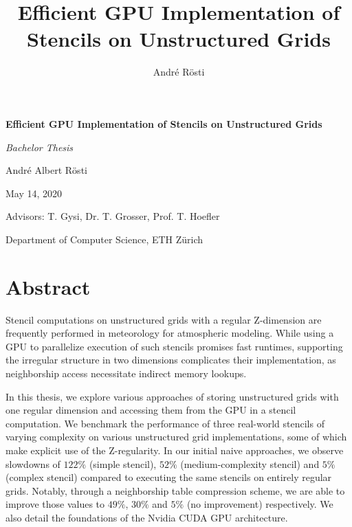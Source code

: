 \documentclass[a4paper, 11pt]{book}
\title{Efficient GPU Implementation of Stencils on Unstructured Grids}
\author{André Rösti}
\begin{document}
\begin{titlepage}
		
	\begin{center}
		
		{\Huge \textbf{Efficient GPU Implementation of Stencils on Unstructured Grids}}
		
		\vspace{2cm}
		
		{\Large \textit{Bachelor Thesis}}
		
		\vspace{2cm}
		
		André Albert Rösti
		
		May 14, 2020
		
	\end{center}
		
	\vfill
		
	\raggedleft Advisors: T. Gysi, Dr. T. Grosser, Prof. T. Hoefler
		
	\raggedleft Department of Computer Science, ETH Zürich
		
\end{titlepage}
\thispagestyle{empty}

\tableofcontents

\chapter*{Abstract}

Stencil computations on unstructured grids with a regular Z-dimension are frequently performed in meteorology for atmospheric modeling. While using a GPU to parallelize execution of such stencils promises fast runtimes, supporting the irregular structure in two dimensions complicates their implementation, as neighborship access necessitate indirect memory lookups.

In this thesis, we explore various approaches of storing unstructured grids with one regular dimension and accessing them from the GPU in a stencil computation. We benchmark the performance of three real-world stencils of varying complexity on various unstructured grid implementations, some of which make explicit use of the Z-regularity. In our initial naive approaches, we observe slowdowns of $122\%$ (simple stencil), $52\%$ (medium-complexity stencil) and $5\%$ (complex stencil) compared to executing the same stencils on entirely regular grids. Notably, through a neighborship table compression scheme, we are able to improve those values to $49\%$, $30\%$ and $5\%$ (no improvement) respectively. We also detail the foundations of the Nvidia CUDA GPU architecture.
\end{document}

